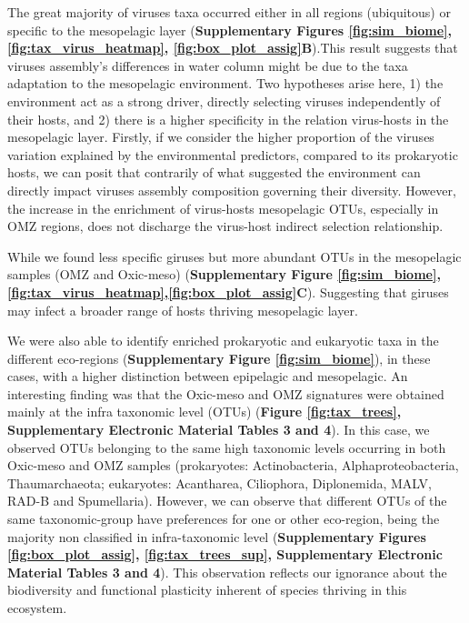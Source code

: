 \documentclass[fleqn,10pt]{wlscirep}
\begin{document}
The great majority of viruses taxa occurred either in all regions (ubiquitous) or specific to the mesopelagic layer (\textbf{Supplementary Figures \ref{fig:sim_biome}, \ref{fig:tax_virus_heatmap}, \ref{fig:box_plot_assig}B}).This result suggests that viruses assembly's differences in water column might be due to the taxa adaptation to the mesopelagic environment. Two hypotheses arise here, 1) the environment act as a strong driver, directly selecting viruses independently of their hosts, and 2) there is a higher specificity in the relation virus-hosts in the mesopelagic layer. Firstly, if we consider the higher proportion of the viruses variation explained by the environmental predictors, compared to its prokaryotic hosts, we can posit that contrarily of what suggested the environment can directly impact viruses assembly composition governing their diversity. However, the increase in the enrichment of virus-hosts mesopelagic OTUs, especially in OMZ regions, does not discharge the virus-host indirect selection relationship.

While we found less specific giruses but more abundant OTUs in the mesopelagic samples (OMZ and Oxic-meso) (\textbf{Supplementary Figure \ref{fig:sim_biome}, \ref{fig:tax_virus_heatmap},\ref{fig:box_plot_assig}C}). Suggesting that giruses may infect a broader range of hosts thriving mesopelagic layer.

We were also able to identify enriched prokaryotic and eukaryotic taxa in the different eco-regions (\textbf{Supplementary Figure \ref{fig:sim_biome}}), in these cases, with a higher distinction between epipelagic and mesopelagic. An interesting finding was that the Oxic-meso and OMZ signatures were obtained mainly at the infra taxonomic level (OTUs) (\textbf{Figure \ref{fig:tax_trees}, Supplementary Electronic Material Tables 3 and 4}). In this case, we observed OTUs belonging to the same high taxonomic levels occurring in both Oxic-meso and OMZ samples (prokaryotes: Actinobacteria, Alphaproteobacteria, Thaumarchaeota; eukaryotes: Acantharea, Ciliophora, Diplonemida, MALV, RAD-B and Spumellaria). However, we can observe that different OTUs of the same taxonomic-group have preferences for one or other eco-region, being the majority non classified in infra-taxonomic level (\textbf{Supplementary Figures \ref{fig:box_plot_assig}, \ref{fig:tax_trees_sup}, Supplementary Electronic Material Tables 3 and 4}). This observation reflects our ignorance about the biodiversity and functional plasticity inherent of species thriving in this ecosystem.
\end{document}
